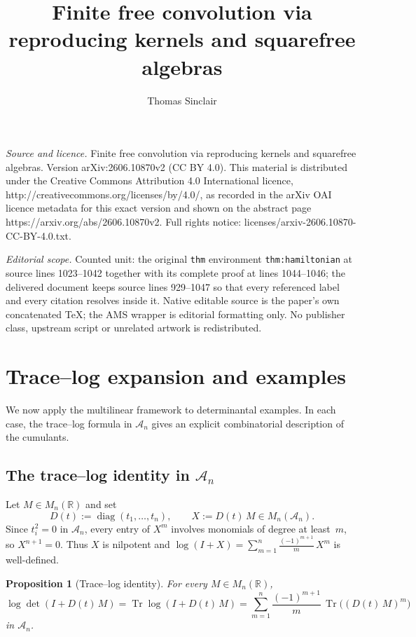 \documentclass[10pt,a4paper]{amsart}
\newtheorem{prop}[thm]{Proposition}
\newcommand{\R}{\mathbb{R}}
\DeclareMathOperator{\Tr}{Tr}
\DeclareMathOperator{\diag}{diag}
\begin{document}
\title[Finite free convolution via reproducing kernels and squarefr]{Finite free convolution via reproducing kernels and squarefree algebras}
\author{Thomas Sinclair}
\date{}
\maketitle
\noindent\emph{Source and licence.} Finite free convolution via reproducing kernels and squarefree algebras. Version arXiv:2606.10870v2 (CC BY 4.0). This material is distributed under the Creative Commons Attribution 4.0 International licence, http://creativecommons.org/licenses/by/4.0/, as recorded in the arXiv OAI licence metadata for this exact version and shown on the abstract page https://arxiv.org/abs/2606.10870v2. Full rights notice: licenses/arxiv-2606.10870-CC-BY-4.0.txt.\par\smallskip
\noindent\textit{Editorial scope.} Counted unit: the original \texttt{thm} environment \texttt{thm:hamiltonian} at source lines 1023--1042 together with its complete proof at lines 1044--1046; the delivered document keeps source lines 929--1047 so that every referenced label and every citation resolves inside it. Native editable source is the paper's own concatenated TeX; the AMS wrapper is editorial formatting only. No publisher class, upstream script or unrelated artwork is redistributed.
\section{Trace--log expansion and examples}
\label{sec:laplacian}

We now apply the multilinear framework to determinantal examples.  In each case, the trace--log formula in $\mathcal{A}_n$ gives an explicit combinatorial description of the cumulants.

\subsection{The trace--log identity in $\mathcal{A}_n$}

Let $M\in M_n(\R)$ and set
\[
  D(t) := \diag(t_1,\dots,t_n),
  \qquad
  X := D(t)\, M \in M_n(\mathcal{A}_n).
\]
Since $t_i^2 = 0$ in $\mathcal{A}_n$, every entry of $X^m$ involves monomials of degree at least~$m$, so $X^{n+1} = 0$. Thus $X$ is nilpotent and $\log(I+X) = \sum_{m=1}^n \frac{(-1)^{m+1}}{m}\, X^m$ is well-defined.

\begin{prop}[Trace--log identity]
\label{prop:trace-log}
For every $M\in M_n(\R)$,
\[
  \log\det(I + D(t)\, M)
  = \Tr\log(I + D(t)\, M)
  = \sum_{m=1}^n \frac{(-1)^{m+1}}{m}\,
  \Tr\bigl((D(t)\, M)^m\bigr)
\]
in $\mathcal{A}_n$.
\end{prop}
\end{document}
